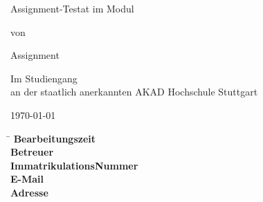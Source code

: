 \begin{titlepage}
\begin{center}
\thispagestyle{empty}

\Large{\textbf{\Title}}
\vspace{1cm}
\onehalfspacing

\large{Assignment-Testat im Modul \Module}

\vspace{1cm}
\normalsize

von

\vspace{.5cm} 
\large{\Name}
\normalsize
\vspace{1cm}

Assignment \\
\textbf{\Degree}
\vspace{1cm}

Im Studiengang \CourseOfStudy \\
an der staatlich anerkannten AKAD Hochschule Stuttgart
\vspace{2cm}

\today



\end{center}

\vfill
\begin{spacing}{1.2}
    \begin{tabbing}
	    \hspace{9cm}     \= \kill
	    \textbf{Bearbeitungszeit}  \>  \ProcessingTime \\
	    \textbf{Betreuer}              \>  \Supervisor \\
	    \textbf{ImmatrikulationsNummer}  \>  \RegistrationNumber \\
	    \textbf{E-Mail}		\> \href{mailto:\Email}{\Email} \\
	    \textbf{Adresse}		\> \Address \\
	    		\> \City
	\end{tabbing}
\end{spacing}
\restoregeometry
\end{titlepage}